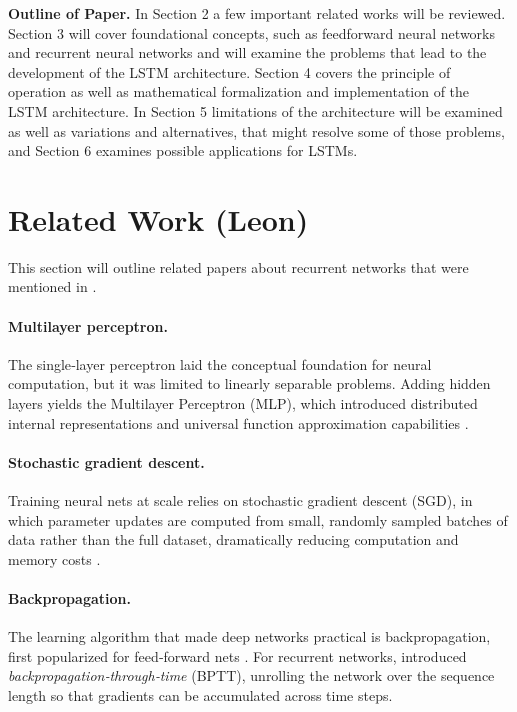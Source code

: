 \documentclass[twoside,a4paper,10pt,DIV=12,BCOR=12mm]{scrartcl}
\begin{document}
\textbf{Outline of Paper.} In Section 2 a few important related works will be reviewed. Section 3 will cover foundational concepts, such as feedforward neural networks and recurrent neural networks and will examine the problems that lead to the development of the LSTM architecture. Section 4 covers the principle of operation as well as mathematical formalization and implementation of the LSTM architecture.  In Section 5 limitations of the architecture will be examined as well as variations and alternatives, that might resolve some of those problems, and Section 6 examines possible applications for LSTMs.\\

\section{Related Work (Leon)}

This section will outline related papers about recurrent networks that were mentioned in \cite{hochreiter1997lstm}.


\paragraph{Multilayer perceptron.} The single‐layer perceptron \cite{Rosenblatt58} laid the conceptual 
foundation for neural computation, but it was limited to linearly separable problems. Adding hidden layers yields the
Multilayer Perceptron (MLP), which introduced distributed internal representations and universal function approximation capabilities \cite{Hornik89}.

\paragraph{Stochastic gradient descent.} Training neural nets at scale relies on stochastic gradient descent (SGD), in which 
parameter updates are computed from small, randomly sampled batches of data rather than the full dataset, dramatically reducing computation and memory costs \cite{Bottou10}.

\paragraph{Backpropagation.}
 The learning algorithm that made deep networks practical is backpropagation, first popularized for 
 feed‑forward nets \cite{Rumelhart86}.  For recurrent networks, 
 \cite{werb1990bptt} introduced \emph{backpropagation‑through‑time} (BPTT), unrolling the 
 network over the sequence length so that gradients can be accumulated across time steps.
\end{document}
